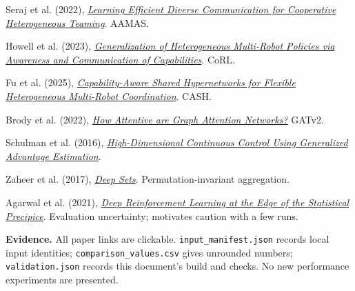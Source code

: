 \documentclass[11pt,letterpaper]{article}
\newcommand{\sub}[1]{\par\vspace{5pt}{\large\bfseries #1}\par\vspace{1pt}}
\newcommand{\evidence}[1]{\vfill{\fontsize{8.4}{10.5}\selectfont\color{muted}\textbf{Evidence.} #1\par}}
\newcommand{\code}[1]{\nolinkurl{#1}}
\begin{document}
\sub{Primary references}
{\fontsize{9}{11}\selectfont
[1] Seraj et al. (2022), \href{https://ifaamas.org/Proceedings/aamas2022/pdfs/p1173.pdf}{\emph{Learning Efficient Diverse Communication for Cooperative Heterogeneous Teaming}}. AAMAS.\par
[2] Howell et al. (2023), \href{https://proceedings.mlr.press/v229/howell23a.html}{\emph{Generalization of Heterogeneous Multi-Robot Policies via Awareness and Communication of Capabilities}}. CoRL.\par
[3] Fu et al. (2025), \href{https://arxiv.org/abs/2501.06058}{\emph{Capability-Aware Shared Hypernetworks for Flexible Heterogeneous Multi-Robot Coordination}}. CASH.\par
[4] Brody et al. (2022), \href{https://arxiv.org/abs/2105.14491}{\emph{How Attentive are Graph Attention Networks?}} GATv2.\par
[5] Schulman et al. (2016), \href{https://arxiv.org/abs/1506.02438}{\emph{High-Dimensional Continuous Control Using Generalized Advantage Estimation}}.\par
[6] Zaheer et al. (2017), \href{https://papers.nips.cc/paper/2017/hash/f22e4747da1aa27e363d86d40ff442fe-Abstract.html}{\emph{Deep Sets}}. Permutation-invariant aggregation.\par
[7] Agarwal et al. (2021), \href{https://arxiv.org/abs/2108.13264}{\emph{Deep Reinforcement Learning at the Edge of the Statistical Precipice}}. Evaluation uncertainty; motivates caution with a few runs.
}
\evidence{All paper links are clickable. \code{input_manifest.json} records local input identities; \code{comparison_values.csv} gives unrounded numbers; \code{validation.json} records this document's build and checks. No new performance experiments are presented.}
\end{document}
